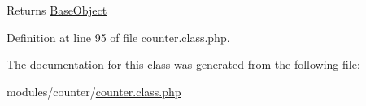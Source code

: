\begin{DoxyReturn}{Returns}
\hyperlink{classBaseObject}{Base\-Object} 
\end{DoxyReturn}


Definition at line 95 of file counter.\-class.\-php.



The documentation for this class was generated from the following file\-:\begin{DoxyCompactItemize}
\item 
modules/counter/\hyperlink{counter_8class_8php}{counter.\-class.\-php}\end{DoxyCompactItemize}
